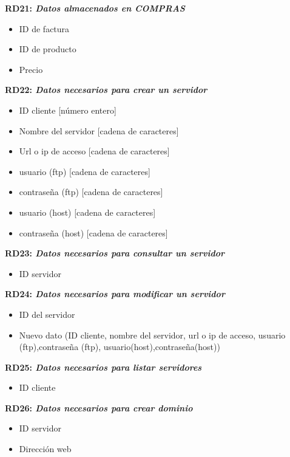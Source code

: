 \documentclass[paper=a4, fontsize=11pt, spanish]{scrartcl}
\begin{document}
	\setlength{\parindent}{0em}
	\textbf{RD21: \textit{Datos almacenados en COMPRAS}}
	\setlength{\parindent}{2em}
	\begin{itemize}
		\item ID de factura
		\item ID de producto
		\item Precio
	\end{itemize}

\setlength{\parindent}{0em}
\textbf{RD22: \textit{Datos necesarios para crear un servidor}}
\setlength{\parindent}{2em}
\begin{itemize}
  \item ID cliente [número entero]
  \item Nombre del servidor [cadena de caracteres]
  \item Url o ip de acceso [cadena de caracteres]
  \item usuario (ftp) [cadena de caracteres]
  \item contraseña (ftp) [cadena de caracteres]
  \item usuario (host) [cadena de caracteres]
  \item contraseña (host) [cadena de caracteres]
\end{itemize}

\setlength{\parindent}{0em}
\textbf{RD23: \textit{Datos necesarios para consultar un servidor}}
\setlength{\parindent}{2em}
\begin{itemize}
  \item ID servidor
\end{itemize}

\setlength{\parindent}{0em}
\textbf{RD24: \textit{Datos necesarios para modificar un servidor}}
\setlength{\parindent}{2em}
\begin{itemize}
  \item ID del servidor
  \item Nuevo dato (ID cliente, nombre del servidor, url o ip de acceso, usuario (ftp),contraseña (ftp), usuario(host),contraseña(host))
\end{itemize}

\setlength{\parindent}{0em}
\textbf{RD25: \textit{Datos necesarios para listar servidores}}
\setlength{\parindent}{2em}
\begin{itemize}
  \item ID cliente
\end{itemize}

\setlength{\parindent}{0em}
\textbf{RD26: \textit{Datos necesarios para crear dominio}}
\setlength{\parindent}{2em}
\begin{itemize}
  \item ID servidor
  \item Dirección web
\end{itemize}
\end{document}
